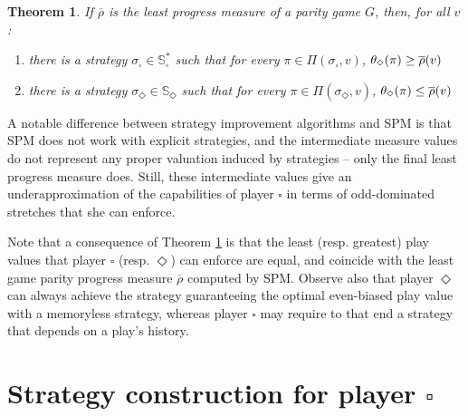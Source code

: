 \documentclass{eptcs}
\newtheorem{theo}{Theorem}
\newenvironment{theorem}{\begin{theo} \rm }{\end{theo}}
\newcommand{\plays}[2]{\Pi(#1,#2)}
\newcommand{\odd}{\ensuremath{\square}\xspace}
\newcommand{\even}{\ensuremath{\Diamond}\xspace}
\newcommand{\strategy}[1]{\mathbb{S}_{#1}}
\newcommand{\memstrategy}[1]{\mathbb{S}_{#1}^*}
\begin{document}
\begin{theorem}
\label{thm:progint}
If $\overline{\rho}$ is the least progress measure of a parity game $G$, then, for all $v$:
\begin{enumerate}
 \item there is a strategy $\sigma_{\odd} \in \memstrategy{\odd}$ such that for every $\pi \in \plays{\sigma_{\odd}}{v}$, $\profile{\even}{\pi} \geq \overline{\rho}(v)$
 \item there is a strategy $\sigma_{\even} \in \strategy{\even}$ such that for every $\pi \in \plays{\sigma_{\even}}{v}$, $\profile{\even}{\pi} \leq \overline{\rho}(v)$
\end{enumerate}
\end{theorem}



A notable difference between strategy improvement algorithms and SPM is
that SPM does not work with explicit strategies, and the intermediate
measure values do not represent any proper valuation induced by
strategies -- only the final least progress measure does. Still,
these intermediate values give an underapproximation of the
capabilities of player $\odd$ in terms of odd-dominated stretches
that she can enforce.

Note that a consequence of Theorem \ref{thm:progint} is that the least (resp. greatest) play values that player $\odd$ (resp. $\even$) can enforce are equal, and coincide with the least game parity progress measure $\overline{\rho}$ computed by SPM. 
Observe also that player $\even$ can always achieve the strategy guaranteeing the optimal even-biased play value with a memoryless strategy, whereas player $\odd$ may require to that end a strategy that depends on a play's history.

\section{Strategy construction for player \odd}
\label{sec:strategy}
\end{document}
